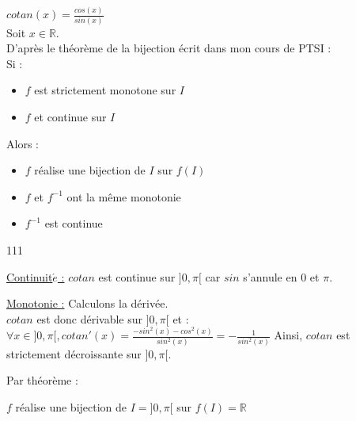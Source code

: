 $cotan(x) = \frac{cos(x)}{sin(x)}$\\
Soit $x\in\mathbb{R}$.\\
D'après le théorème de la bijection écrit dans mon cours de PTSI :
\\Si :
\begin{itemize}
  \item $f$ est strictement monotone sur $I$
  \item $f$ et continue sur $I$
\end{itemize}
Alors :
\begin{itemize}
  \item $f$ réalise une bijection de $I$ sur $f(I)$
  \item $f$  et $f^{-1}$ ont la même monotonie
  \item $f^{-1}$ est continue
\end{itemize}

\begin{dinglist}{111}
  \item \ul{Continuit$\acute{e}$ :}
  $cotan$ est continue sur $]0, \pi[$ car $sin$ s'annule en $0$ et $\pi$.
        \item \ul{Monotonie :} Calculons la dérivée.\\
      $cotan$ est donc dérivable sur $]0, \pi[$ et : \\
      $\forall x \in ]0, \pi[, cotan'(x) = \frac{-sin^2(x)-cos^2(x)}{sin^2(x)}=-\frac{1}{sin^2(x)}$
        Ainsi, $cotan$ est strictement décroissante sur $]0, \pi[$.
\end{dinglist}
Par théorème :
\begin{result}
  $f$ réalise une bijection de $I = ]0, \pi[$ sur $f(I) = \mathbb{R}$
\end{result}
